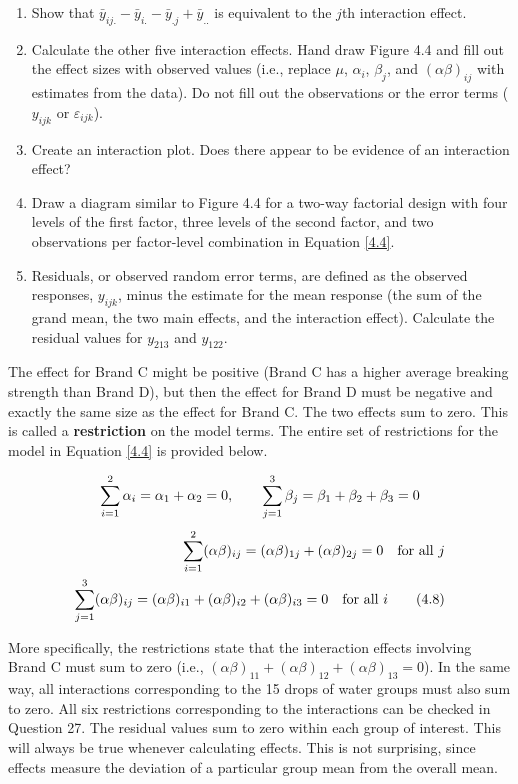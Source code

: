 \documentclass[
]{book}
\providecommand{\tightlist}{%
  \setlength{\itemsep}{0pt}\setlength{\parskip}{0pt}}
\begin{document}
\begin{enumerate}
\def\labelenumi{\arabic{enumi}.}
\setcounter{enumi}{25}
\tightlist
\item
  Show that \(\bar{y}_{ij.} - \bar{y}_{i.} - \bar{y}_{.j} + \bar{y}_{..}\) is equivalent to the \(j\)th interaction effect.
\item
  Calculate the other five interaction effects. Hand draw Figure 4.4 and fill out the effect sizes with observed values (i.e., replace \(\mu\), \(\alpha_i\), \(\beta_j\), and \((\alpha\beta)_{ij}\) with estimates from the data). Do not fill out the observations or the error terms (\(y_{ijk}\) or \(\varepsilon_{ijk}\)).
\item
  Create an interaction plot. Does there appear to be evidence of an interaction effect?
\item
  Draw a diagram similar to Figure 4.4 for a two-way factorial design with four levels of the first factor, three levels of the second factor, and two observations per factor-level combination in Equation \ref{4.4}.
\item
  Residuals, or observed random error terms, are defined as the observed responses, \(y_{ijk}\), minus the estimate for the mean response (the sum of the grand mean, the two main effects, and the interaction effect). Calculate the residual values for \(y_{213}\) and \(y_{122}\).
\end{enumerate}

The effect for Brand C might be positive (Brand C has a higher average breaking strength than Brand D), but then the effect for Brand D must be negative and exactly the same size as the effect for Brand C. The two effects sum to zero. This is called a \textbf{restriction} on the model terms. The entire set of restrictions for the model in Equation \ref{4.4} is provided below.

\begin{align}
\sum_{i=1}^{2} \alpha_i = \alpha_1 + \alpha_2 = 0, \qquad \sum_{j=1}^{3} \beta_j = \beta_1 + \beta_2 + \beta_3 = 0 \notag
\end{align}
\begin{align}
\sum_{i=1}^{2} (\alpha\beta)_{ij} = (\alpha\beta)_{1j} + (\alpha\beta)_{2j} = 0 \quad \text{for all } j \notag \\
\sum_{j=1}^{3} (\alpha\beta)_{ij} = (\alpha\beta)_{i1} + (\alpha\beta)_{i2} + (\alpha\beta)_{i3} = 0 \quad \text{for all } i \tag{4.8} \label{4.8}
\end{align}

More specifically, the restrictions state that the interaction effects involving Brand C must sum to zero (i.e., \((\alpha\beta)_{11} + (\alpha\beta)_{12} + (\alpha\beta)_{13} = 0\)). In the same way, all interactions corresponding to the 15 drops of water groups must also sum to zero. All six restrictions corresponding to the interactions can be checked in Question 27. The residual values sum to zero within each group of interest. This will always be true whenever calculating effects. This is not surprising, since effects measure the deviation of a particular group mean from the overall mean.
\end{document}
